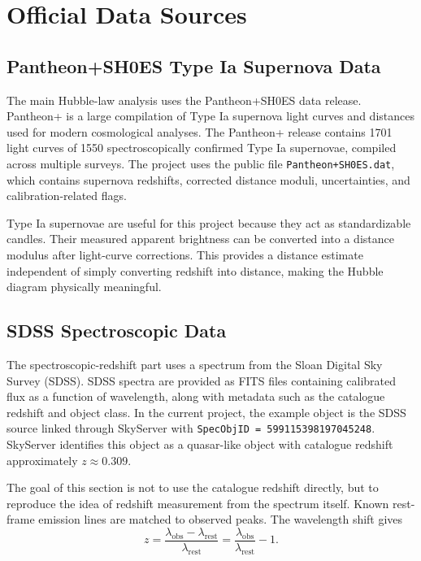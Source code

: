 \documentclass[11pt,a4paper]{article}
\begin{document}
\section{Official Data Sources}

\subsection{Pantheon+SH0ES Type Ia Supernova Data}

The main Hubble-law analysis uses the Pantheon+SH0ES data release. Pantheon+ is a large compilation of Type Ia supernova light curves and distances used for modern cosmological analyses. The Pantheon+ release contains 1701 light curves of 1550 spectroscopically confirmed Type Ia supernovae, compiled across multiple surveys. The project uses the public file \texttt{Pantheon+SH0ES.dat}, which contains supernova redshifts, corrected distance moduli, uncertainties, and calibration-related flags.

Type Ia supernovae are useful for this project because they act as standardizable candles. Their measured apparent brightness can be converted into a distance modulus after light-curve corrections. This provides a distance estimate independent of simply converting redshift into distance, making the Hubble diagram physically meaningful.

\subsection{SDSS Spectroscopic Data}

The spectroscopic-redshift part uses a spectrum from the Sloan Digital Sky Survey (SDSS). SDSS spectra are provided as FITS files containing calibrated flux as a function of wavelength, along with metadata such as the catalogue redshift and object class. In the current project, the example object is the SDSS source linked through SkyServer with \texttt{SpecObjID = 599115398197045248}. SkyServer identifies this object as a quasar-like object with catalogue redshift approximately $z \approx 0.309$.

The goal of this section is not to use the catalogue redshift directly, but to reproduce the idea of redshift measurement from the spectrum itself. Known rest-frame emission lines are matched to observed peaks. The wavelength shift gives
\begin{equation}
    z = \frac{\lambda_{\mathrm{obs}} - \lambda_{\mathrm{rest}}}{\lambda_{\mathrm{rest}}}
      = \frac{\lambda_{\mathrm{obs}}}{\lambda_{\mathrm{rest}}} - 1.
\end{equation}
\end{document}
